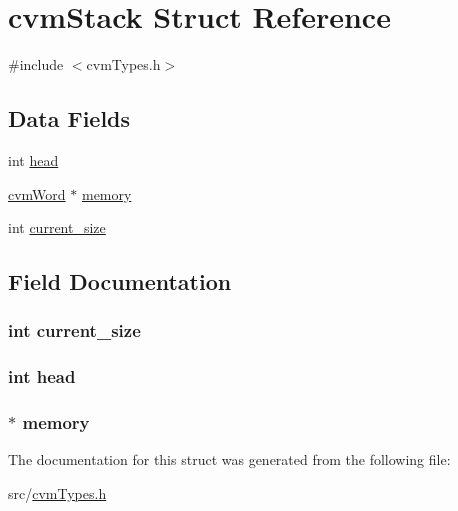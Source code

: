 \hypertarget{structcvm_stack}{\section{cvm\-Stack Struct Reference}
\label{structcvm_stack}
}


{\ttfamily \#include $<$cvm\-Types.\-h$>$}

\subsection*{Data Fields}
\begin{DoxyCompactItemize}
\item 
int \hyperlink{structcvm_stack_a20358970b1abaf992eb85e071e454653}{head}
\item 
\hyperlink{cvm_types_8h_a53f56afae5106d482ea7690891c4b668}{cvm\-Word} $\ast$ \hyperlink{structcvm_stack_a85478df6a4c8ac08ce55d50177351a65}{memory}
\item 
int \hyperlink{structcvm_stack_afb54d9f9368a5e14e68aa90ba2d53d40}{current\-\_\-size}
\end{DoxyCompactItemize}


\subsection{Field Documentation}
\hypertarget{structcvm_stack_afb54d9f9368a5e14e68aa90ba2d53d40}{
\subsubsection[{current\-\_\-size}]{\setlength{\rightskip}{0pt plus 5cm}int current\-\_\-size}}\label{structcvm_stack_afb54d9f9368a5e14e68aa90ba2d53d40}
\hypertarget{structcvm_stack_a20358970b1abaf992eb85e071e454653}{
\subsubsection[{head}]{\setlength{\rightskip}{0pt plus 5cm}int head}}\label{structcvm_stack_a20358970b1abaf992eb85e071e454653}
\hypertarget{structcvm_stack_a85478df6a4c8ac08ce55d50177351a65}{
\subsubsection[{memory}]{$\ast$ memory}}\label{structcvm_stack_a85478df6a4c8ac08ce55d50177351a65}


The documentation for this struct was generated from the following file\-:\begin{DoxyCompactItemize}
\item 
src/\hyperlink{cvm_types_8h}{cvm\-Types.\-h}\end{DoxyCompactItemize}
